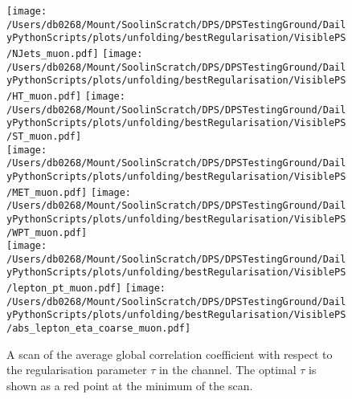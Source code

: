 \begin{figure}[hp]
	\centering
	\texttt{[image: /Users/db0268/Mount/SoolinScratch/DPS/DPSTestingGround/DailyPythonScripts/plots/unfolding/bestRegularisation/VisiblePS/NJets\_muon.pdf]} 
	\texttt{[image: /Users/db0268/Mount/SoolinScratch/DPS/DPSTestingGround/DailyPythonScripts/plots/unfolding/bestRegularisation/VisiblePS/HT\_muon.pdf]}
	\texttt{[image: /Users/db0268/Mount/SoolinScratch/DPS/DPSTestingGround/DailyPythonScripts/plots/unfolding/bestRegularisation/VisiblePS/ST\_muon.pdf]} \\
	\texttt{[image: /Users/db0268/Mount/SoolinScratch/DPS/DPSTestingGround/DailyPythonScripts/plots/unfolding/bestRegularisation/VisiblePS/MET\_muon.pdf]}
	\texttt{[image: /Users/db0268/Mount/SoolinScratch/DPS/DPSTestingGround/DailyPythonScripts/plots/unfolding/bestRegularisation/VisiblePS/WPT\_muon.pdf]} \\
	\texttt{[image: /Users/db0268/Mount/SoolinScratch/DPS/DPSTestingGround/DailyPythonScripts/plots/unfolding/bestRegularisation/VisiblePS/lepton\_pt\_muon.pdf]} 
	\texttt{[image: /Users/db0268/Mount/SoolinScratch/DPS/DPSTestingGround/DailyPythonScripts/plots/unfolding/bestRegularisation/VisiblePS/abs\_lepton\_eta\_coarse\_muon.pdf]} \\
	\caption[A scan of the average global correlation coefficient with respect to the regularisation parameter $\tau$ in the \muJets{} channel. The optimal $\tau$ is shown as a red point at the minimum of the scan.]{A scan of the average global correlation coefficient with respect to the regularisation parameter $\tau$ in the \muJets{} channel. The optimal $\tau$ is shown as a red point at the minimum of the scan.}
	\label{fig:TauMU}
\end{figure}
